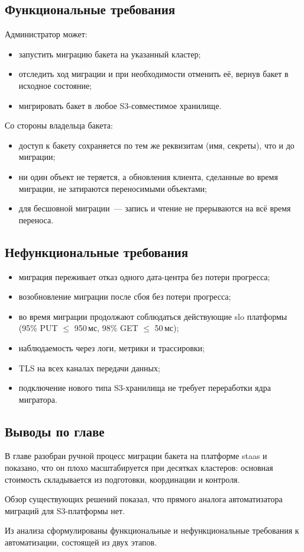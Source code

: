 \subsection{Функциональные требования}\label{subsec:func-req}

Администратор может:
\begin{itemize}
    \item запустить миграцию бакета на указанный кластер;
    \item отследить ход миграции и при необходимости отменить её, вернув бакет в исходное состояние;
    \item мигрировать бакет в любое S3-совместимое хранилище.
\end{itemize}

Со стороны владельца бакета:
\begin{itemize}
    \item доступ к бакету сохраняется по тем же реквизитам (имя, секреты), что и до миграции;
    \item ни один объект не теряется, а обновления клиента, сделанные во время миграции, не затираются переносимыми объектами;
    \item для бесшовной миграции~--- запись и чтение не прерываются на всё время переноса.
\end{itemize}

\subsection{Нефункциональные требования}\label{subsec:nonfunc-req}

\begin{itemize}
    \item миграция переживает отказ одного дата-центра без потери прогресса;
    \item возобновление миграции после сбоя без потери прогресса;
    \item во время миграции продолжают соблюдаться действующие \gls{slo} платформы (95\% PUT $\le$ 950\,мс, 98\% GET $\le$ 50\,мс);
    \item наблюдаемость через логи, метрики и трассировки;
    \item TLS на всех каналах передачи данных;
    \item подключение нового типа S3-хранилища не требует переработки ядра мигратора.
\end{itemize}

\subsection{Выводы по главе}\label{subsec:ch1-summary}

В главе разобран ручной процесс миграции бакета на платформе \gls{staas} и показано, что он плохо масштабируется при десятках кластеров: основная стоимость складывается из подготовки, координации и контроля.

Обзор существующих решений показал, что прямого аналога автоматизатора миграций для S3-платформы нет.

Из анализа сформулированы функциональные и нефункциональные требования к автоматизации, состоящей из двух этапов.
